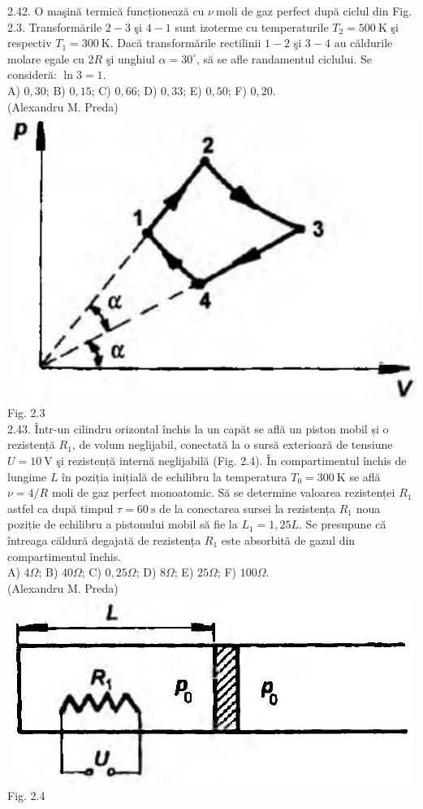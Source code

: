 2.42. O maşină termică funcționează cu  $\nu \mathrm{~moli}$ de gaz perfect după ciclul din Fig. 2.3. Transformările $2-3$ şi $4-1$ sunt izoterme cu temperaturile $T_{2}=500 \mathrm{~K}$ şi respectiv $T_{1}=300 \mathrm{~K}$. Dacă transformările rectilinii $1-2$ şi $3-4$ au căldurile molare egale cu $2 R$ şi unghiul $\alpha=30^{\circ}$, să se afle randamentul ciclului. Se consideră: $\ln 3=1$.\\ A) $0,30$; B) $0,15$; C) $0,66$; D) $0,33$; E) $0,50$; F) $0,20$.\\ (Alexandru M. Preda)\\ \includegraphics[width=0.4\linewidth]{images/2025_07_01_5b3ff9fa0d508c8e9f17g-081(1)} Fig. 2.3\\

2.43. Într-un cilindru orizontal închis la un capăt se află un piston mobil și o rezistență $R_{1}$, de volum neglijabil, conectată la o sursă exterioară de tensiune $U=10 \mathrm{~V}$ şi rezistență internă neglijabilă (Fig. 2.4). În compartimentul închis de lungime $L$ în poziția inițială de echilibru la temperatura $T_{0}=300 \mathrm{~K}$ se află $\nu=4 / R$ moli de gaz perfect monoatomic. Să se determine valoarea rezistenței $R_{1}$ astfel ca după timpul $\tau=60 \mathrm{~s}$ de la conectarea sursei la rezistența $R_{1}$ noua poziție de echilibru a pistonului mobil să fie la $L_{1}=1,25 L$. Se presupune că întreaga căldură degajată de rezistența $R_{1}$ este absorbitã de gazul din compartimentul închis.\\ A) $4 \Omega$; B) $40 \Omega$; C) $0,25 \Omega$; D) $8 \Omega$; E) $25 \Omega$; F) $100 \Omega$.\\ (Alexandru M. Preda)\\ \includegraphics[width=0.4\linewidth]{images/2025_07_01_5b3ff9fa0d508c8e9f17g-082} Fig. 2.4\\


